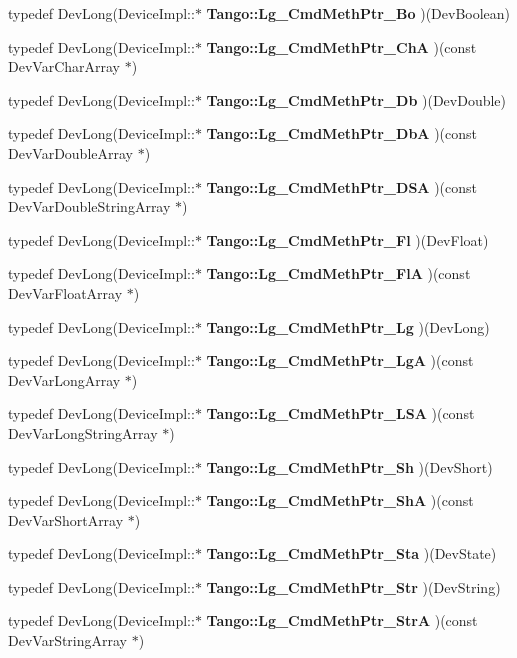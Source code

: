 \begin{DoxyCompactItemize}
\item 
typedef Dev\-Long(Device\-Impl\-::$\ast$ {\bf Tango\-::\-Lg\-\_\-\-Cmd\-Meth\-Ptr\-\_\-\-Bo} )(Dev\-Boolean)
\item 
typedef Dev\-Long(Device\-Impl\-::$\ast$ {\bf Tango\-::\-Lg\-\_\-\-Cmd\-Meth\-Ptr\-\_\-\-Ch\-A} )(const Dev\-Var\-Char\-Array $\ast$)
\item 
typedef Dev\-Long(Device\-Impl\-::$\ast$ {\bf Tango\-::\-Lg\-\_\-\-Cmd\-Meth\-Ptr\-\_\-\-Db} )(Dev\-Double)
\item 
typedef Dev\-Long(Device\-Impl\-::$\ast$ {\bf Tango\-::\-Lg\-\_\-\-Cmd\-Meth\-Ptr\-\_\-\-Db\-A} )(const Dev\-Var\-Double\-Array $\ast$)
\item 
typedef Dev\-Long(Device\-Impl\-::$\ast$ {\bf Tango\-::\-Lg\-\_\-\-Cmd\-Meth\-Ptr\-\_\-\-D\-S\-A} )(const Dev\-Var\-Double\-String\-Array $\ast$)
\item 
typedef Dev\-Long(Device\-Impl\-::$\ast$ {\bf Tango\-::\-Lg\-\_\-\-Cmd\-Meth\-Ptr\-\_\-\-Fl} )(Dev\-Float)
\item 
typedef Dev\-Long(Device\-Impl\-::$\ast$ {\bf Tango\-::\-Lg\-\_\-\-Cmd\-Meth\-Ptr\-\_\-\-Fl\-A} )(const Dev\-Var\-Float\-Array $\ast$)
\item 
typedef Dev\-Long(Device\-Impl\-::$\ast$ {\bf Tango\-::\-Lg\-\_\-\-Cmd\-Meth\-Ptr\-\_\-\-Lg} )(Dev\-Long)
\item 
typedef Dev\-Long(Device\-Impl\-::$\ast$ {\bf Tango\-::\-Lg\-\_\-\-Cmd\-Meth\-Ptr\-\_\-\-Lg\-A} )(const Dev\-Var\-Long\-Array $\ast$)
\item 
typedef Dev\-Long(Device\-Impl\-::$\ast$ {\bf Tango\-::\-Lg\-\_\-\-Cmd\-Meth\-Ptr\-\_\-\-L\-S\-A} )(const Dev\-Var\-Long\-String\-Array $\ast$)
\item 
typedef Dev\-Long(Device\-Impl\-::$\ast$ {\bf Tango\-::\-Lg\-\_\-\-Cmd\-Meth\-Ptr\-\_\-\-Sh} )(Dev\-Short)
\item 
typedef Dev\-Long(Device\-Impl\-::$\ast$ {\bf Tango\-::\-Lg\-\_\-\-Cmd\-Meth\-Ptr\-\_\-\-Sh\-A} )(const Dev\-Var\-Short\-Array $\ast$)
\item 
typedef Dev\-Long(Device\-Impl\-::$\ast$ {\bf Tango\-::\-Lg\-\_\-\-Cmd\-Meth\-Ptr\-\_\-\-Sta} )(Dev\-State)
\item 
typedef Dev\-Long(Device\-Impl\-::$\ast$ {\bf Tango\-::\-Lg\-\_\-\-Cmd\-Meth\-Ptr\-\_\-\-Str} )(Dev\-String)
\item 
typedef Dev\-Long(Device\-Impl\-::$\ast$ {\bf Tango\-::\-Lg\-\_\-\-Cmd\-Meth\-Ptr\-\_\-\-Str\-A} )(const Dev\-Var\-String\-Array $\ast$)
\item 

\end{DoxyCompactItemize}
